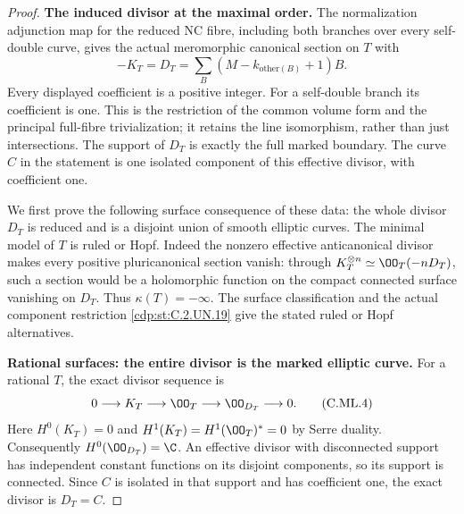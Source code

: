 \begin{proof}
\par\medskip\noindent\textbf{The induced divisor at the maximal order.}
The normalization adjunction map for the reduced NC
fibre, including both branches over every self-double
curve, gives the actual meromorphic canonical section
on \(T\) with
\[
      -K_T=D_T=\sum_B (M-k_{\mathrm{other}(B)}+1)B.
\tag{C.ML.3}\label{cdp:eq:C.ML.3}
\]
Every displayed coefficient is a positive integer.
For a self-double branch its coefficient is one.
This is the restriction of the common volume form and
the principal full-fibre trivialization; it retains
the line isomorphism, rather than just intersections.
The support of \(D_T\) is exactly the full marked
boundary. The curve \(C\) in the statement is one
isolated component of this effective divisor, with
coefficient one.

We first prove the following surface consequence of
these data: the whole divisor \(D_T\) is reduced and
is a disjoint union of smooth elliptic curves. The
minimal model of \(T\) is ruled or Hopf. Indeed the
nonzero effective anticanonical divisor makes every
positive pluricanonical section vanish: through
\(K_T^{\otimes n}\simeq\OO_T(-nD_T)\), such a
section would be a holomorphic function on the compact
connected surface vanishing on \(D_T\). Thus
\(\kappa(T)=-\infty\). The surface classification
and the actual component restriction \ref{cdp:st:C.2.UN.19} give the
stated ruled or Hopf alternatives.

\par\medskip\noindent\textbf{Rational surfaces: the entire divisor is the marked elliptic curve.}
For a rational \(T\), the exact divisor sequence is
\[
 0\longrightarrow K_T\longrightarrow\OO_T
          \longrightarrow\OO_{D_T}\longrightarrow0.
\tag{C.ML.4}\label{cdp:eq:C.ML.4}
\]
Here \(H^0(K_T)=0\) and
\(H^1(K_T)=H^1(\OO_T)^*=0\) by Serre duality.
Consequently \(H^0(\OO_{D_T})=\C\). An effective
divisor with disconnected support has independent
constant functions on its disjoint components, so
its support is connected. Since \(C\) is isolated
in that support and has coefficient one, the exact
divisor is \(D_T=C\).


\end{proof}
